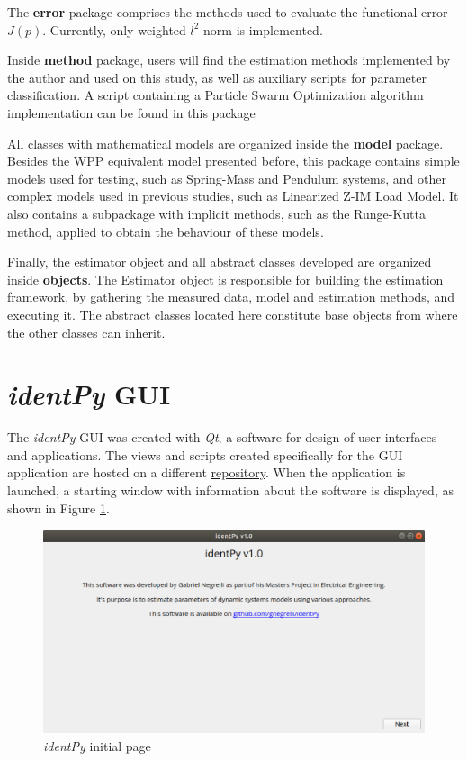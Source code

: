 The \textbf{error} package comprises the methods used to evaluate the functional error $J(p)$. Currently, only weighted $l^{2}$-norm is implemented.

Inside \textbf{method} package, users will find the estimation methods implemented by the author and used on this study, as well as auxiliary scripts for parameter classification. A script containing a Particle Swarm Optimization algorithm implementation can be found in this package

All classes with mathematical models are organized inside the \textbf{model} package. Besides the WPP equivalent model presented before, this package contains simple models used for testing, such as Spring-Mass and Pendulum systems, and other complex models used in previous studies, such as Linearized Z-IM Load Model. It also contains a subpackage with implicit methods, such as the Runge-Kutta method, applied to obtain the behaviour of these models.

Finally, the estimator object and all abstract classes developed are organized inside \textbf{objects}. The Estimator object is responsible for building the estimation framework, by gathering the measured data, model and estimation methods, and executing it. The abstract classes located here constitute base objects from where the other classes can inherit.

\section{\textit{identPy} GUI}

The \textit{identPy} GUI was created with \textit{Qt}, a software for design of user interfaces and applications. The views and scripts created specifically for the GUI application are hosted on a different \href{https://github.com/gnegrelli/identPy_GUI}{repository}. When the application is launched, a starting window with information about the software is displayed, as shown in Figure \ref{fig: initial_page}.

\begin{figure}[!h]
	\caption{\textit{identPy} initial page}
	\begin{center}
		\includegraphics[scale=.5]{Images/Software_initial_page.eps}
	\end{center}
	\label{fig: initial_page}
\end{figure}

